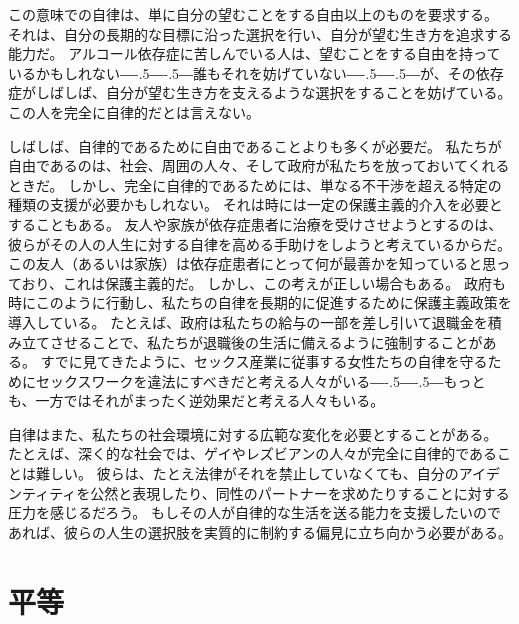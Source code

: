 \documentclass[paper=a4,book,openany]{jlreq}
\def\DDASH{―\kern-.5\zw―\kern-.5\zw―} %
\begin{document}
この意味での自律は、単に自分の望むことをする自由以上のものを要求する。
それは、自分の長期的な目標に沿った選択を行い、自分が望む生き方を追求する能力だ。
アルコール依存症に苦しんでいる人は、望むことをする自由を持っているかもしれない{\DDASH}誰もそれを妨げていない{\DDASH}が、その依存症がしばしば、自分が望む生き方を支えるような選択をすることを妨げている。
この人を完全に自律的だとは言えない。

しばしば、自律的であるために自由であることよりも多くが必要だ。
私たちが自由であるのは、社会、周囲の人々、そして政府が私たちを放っておいてくれるときだ。
しかし、完全に自律的であるためには、単なる不干渉を超える特定の種類の支援が必要かもしれない。
それは時には一定の保護主義的介入を必要とすることもある。
友人や家族が依存症患者に治療を受けさせようとするのは、彼らがその人の人生に対する自律を高める手助けをしようと考えているからだ。
この友人（あるいは家族）は依存症患者にとって何が最善かを知っていると思っており、これは保護主義的だ。
しかし、この考えが正しい場合もある。
政府も時にこのように行動し、私たちの自律を長期的に促進するために保護主義政策を導入している。
たとえば、政府は私たちの給与の一部を差し引いて退職金を積み立てさせることで、私たちが退職後の生活に備えるように強制することがある。
すでに見てきたように、セックス産業に従事する女性たちの自律を守るためにセックスワークを違法にすべきだと考える人々がいる{\DDASH}もっとも、一方ではそれがまったく逆効果だと考える人々もいる。

自律はまた、私たちの社会環境に対する広範な変化を必要とすることがある。
たとえば、深く的な社会では、ゲイやレズビアンの人々が完全に自律的であることは難しい。
彼らは、たとえ法律がそれを禁止していなくても、自分のアイデンティティを公然と表現したり、同性のパートナーを求めたりすることに対する圧力を感じるだろう。
もしその人が自律的な生活を送る能力を支援したいのであれば、彼らの人生の選択肢を実質的に制約する偏見に立ち向かう必要がある。

\section{平等}
\end{document}
